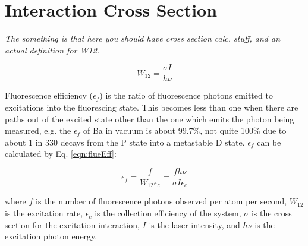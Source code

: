 

\section{Interaction Cross Section} %
\label{sec:fluorEff}

\emph{\color{gray}The something is that here you should have cross section calc. stuff, and an actual definition for W12.}

\begin{equation}
W_{12} =  \frac{\sigma I}{h \nu}
\label{eqn:w12}
\end{equation}

Fluorescence efficiency ($\epsilon_{f}$) is the ratio of fluorescence photons emitted to excitations into the fluorescing state.  This becomes less than one when there are paths out of the excited state other than the one which emits the photon being measured, e.g. the $\epsilon_{f}$ of Ba in vacuum is about 99.7\%, not quite 100\% due to about 1 in 330 decays from the P state into a metastable D state.  $\epsilon_{f}$ can be calculated by Eq. \ref{eqn:flueEff}:

\begin{equation}
\epsilon_{f} = \frac{f}{W_{12} \epsilon_{c}} = \frac{f h \nu}{\sigma I \epsilon_{c}}
\label{eqn:flueEff}
\end{equation}

\noindent
where $f$ is the number of fluorescence photons observed per atom per second, $W_{12}$ is the excitation rate, $\epsilon_{c}$ is the collection efficiency of the system, $\sigma$ is the cross section for the excitation interaction, $I$ is the laser intensity, and $h \nu$ is the excitation photon energy.  
